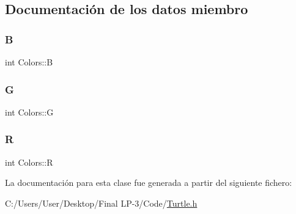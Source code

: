 \subsection{Documentación de los datos miembro}
\mbox{\label{class_colors_a05f5159cf285fcd2c8869fb0b38409e1}} 
\subsubsection{\texorpdfstring{B}{B}}
{\footnotesize\ttfamily int Colors\+::B}

\mbox{\label{class_colors_a87292ebcf4f2d4099e5e57e47dba81f3}} 
\subsubsection{\texorpdfstring{G}{G}}
{\footnotesize\ttfamily int Colors\+::G}

\mbox{\label{class_colors_a40ea32cca218e70d542afbac54daa803}} 
\subsubsection{\texorpdfstring{R}{R}}
{\footnotesize\ttfamily int Colors\+::R}



La documentación para esta clase fue generada a partir del siguiente fichero\+:\begin{DoxyCompactItemize}
\item 
C\+:/\+Users/\+User/\+Desktop/\+Final L\+P-\/3/\+Code/\mbox{\hyperlink{_turtle_8h}{Turtle.\+h}}\end{DoxyCompactItemize}

